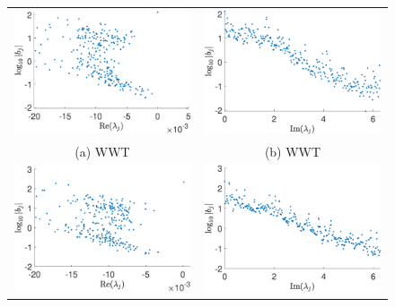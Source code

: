 \documentclass[a4paper,11pt]{article}
\begin{document}
\begin{figure}[!ht]
\centering
\begin{tabular}{cc}
\includegraphics[width=.525\textwidth]{bvals_vs_real_lam_wwtforce_K_256_Lx_128_tf_1_pt5e4} &\hspace{-25pt} \includegraphics[width=.525\textwidth]{bvals_vs_imag_lam_wwtforce_K_256_Lx_128_tf_1_pt5e4}\\
(a) WWT & (b) WWT\\
\includegraphics[width=.525\textwidth]{bvals_vs_real_lam_lfforce_K_256_Lx_128_tf_1_pt5e4} &\hspace{-25pt} \includegraphics[width=.525\textwidth]{bvals_vs_imag_lam_lfforce_K_256_Lx_128_tf_1_pt5e4}\\

\end{tabular}
\end{figure}
\end{document}
